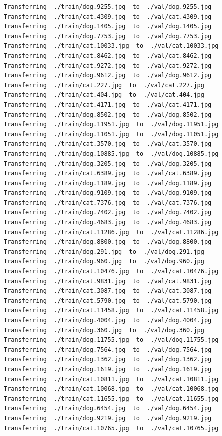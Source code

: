 \documentclass[]{book}
\theoremstyle{definition}
\theoremstyle{definition}
\theoremstyle{definition}
\theoremstyle{remark}
\begin{document}
\begin{verbatim}
Transferring  ./train/dog.9255.jpg  to  ./val/dog.9255.jpg
Transferring  ./train/cat.4309.jpg  to  ./val/cat.4309.jpg
Transferring  ./train/dog.1405.jpg  to  ./val/dog.1405.jpg
Transferring  ./train/dog.7753.jpg  to  ./val/dog.7753.jpg
Transferring  ./train/cat.10033.jpg  to  ./val/cat.10033.jpg
Transferring  ./train/cat.8462.jpg  to  ./val/cat.8462.jpg
Transferring  ./train/cat.9272.jpg  to  ./val/cat.9272.jpg
Transferring  ./train/dog.9612.jpg  to  ./val/dog.9612.jpg
Transferring  ./train/cat.227.jpg  to  ./val/cat.227.jpg
Transferring  ./train/cat.404.jpg  to  ./val/cat.404.jpg
Transferring  ./train/cat.4171.jpg  to  ./val/cat.4171.jpg
Transferring  ./train/dog.8502.jpg  to  ./val/dog.8502.jpg
Transferring  ./train/dog.11951.jpg  to  ./val/dog.11951.jpg
Transferring  ./train/dog.11051.jpg  to  ./val/dog.11051.jpg
Transferring  ./train/cat.3570.jpg  to  ./val/cat.3570.jpg
Transferring  ./train/dog.10885.jpg  to  ./val/dog.10885.jpg
Transferring  ./train/dog.3205.jpg  to  ./val/dog.3205.jpg
Transferring  ./train/cat.6389.jpg  to  ./val/cat.6389.jpg
Transferring  ./train/dog.1189.jpg  to  ./val/dog.1189.jpg
Transferring  ./train/dog.9109.jpg  to  ./val/dog.9109.jpg
Transferring  ./train/cat.7376.jpg  to  ./val/cat.7376.jpg
Transferring  ./train/dog.7402.jpg  to  ./val/dog.7402.jpg
Transferring  ./train/dog.4683.jpg  to  ./val/dog.4683.jpg
Transferring  ./train/cat.11286.jpg  to  ./val/cat.11286.jpg
Transferring  ./train/dog.8800.jpg  to  ./val/dog.8800.jpg
Transferring  ./train/dog.291.jpg  to  ./val/dog.291.jpg
Transferring  ./train/dog.960.jpg  to  ./val/dog.960.jpg
Transferring  ./train/cat.10476.jpg  to  ./val/cat.10476.jpg
Transferring  ./train/cat.9831.jpg  to  ./val/cat.9831.jpg
Transferring  ./train/cat.3087.jpg  to  ./val/cat.3087.jpg
Transferring  ./train/cat.5790.jpg  to  ./val/cat.5790.jpg
Transferring  ./train/cat.11458.jpg  to  ./val/cat.11458.jpg
Transferring  ./train/dog.4004.jpg  to  ./val/dog.4004.jpg
Transferring  ./train/dog.360.jpg  to  ./val/dog.360.jpg
Transferring  ./train/dog.11755.jpg  to  ./val/dog.11755.jpg
Transferring  ./train/dog.7564.jpg  to  ./val/dog.7564.jpg
Transferring  ./train/dog.1362.jpg  to  ./val/dog.1362.jpg
Transferring  ./train/dog.1619.jpg  to  ./val/dog.1619.jpg
Transferring  ./train/cat.10811.jpg  to  ./val/cat.10811.jpg
Transferring  ./train/cat.10068.jpg  to  ./val/cat.10068.jpg
Transferring  ./train/cat.11655.jpg  to  ./val/cat.11655.jpg
Transferring  ./train/dog.6454.jpg  to  ./val/dog.6454.jpg
Transferring  ./train/dog.9219.jpg  to  ./val/dog.9219.jpg
Transferring  ./train/cat.10765.jpg  to  ./val/cat.10765.jpg

\end{verbatim}
\end{document}
